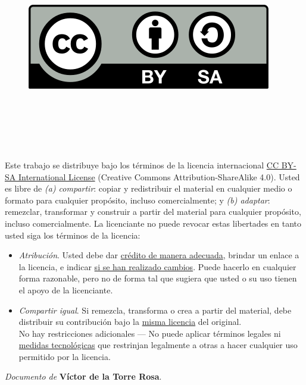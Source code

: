 
\cleardoublepage

\begin{flushright}
\begin{figure}
 \ \ \ \ \includegraphics[width=0.25\linewidth,right]{figs/by-sa.png}
 \label{fig:cc} 
 \end{figure}
\end{flushright}

\

\

\

\noindent
Este trabajo se distribuye bajo los términos de la licencia internacional \href{http://creativecommons.org/licenses/by-sa/4.0/}{CC BY-SA International License} (Creative Commons Attribution-ShareAlike 4.0). Usted es libre de \textit{(a) compartir}: copiar y redistribuir el material en cualquier medio o formato para cualquier propósito, incluso comercialmente; y \textit{(b) adaptar}: remezclar, transformar y construir a partir del material para cualquier propósito, incluso comercialmente. La licenciante no puede revocar estas libertades en tanto usted siga los términos de la licencia:

\begin{itemize}
\item \textit{Atribución}. Usted debe dar \href{https://creativecommons.org/licenses/by-sa/4.0/deed.es#ref-appropriate-credit}{crédito de manera adecuada}, brindar un enlace a la licencia, e indicar \href{https://creativecommons.org/licenses/by-sa/4.0/deed.es#ref-indicate-changes}{si se han realizado cambios}. Puede hacerlo en cualquier forma razonable, pero no de forma tal que sugiera que usted o su uso tienen el apoyo de la licenciante.
\item \textit{Compartir igual}. Si remezcla, transforma o crea a partir del material, debe distribuir su contribución bajo la \href{https://creativecommons.org/licenses/by-sa/4.0/deed.es#ref-same-license}{misma licencia} del original.\\
No hay restricciones adicionales — No puede aplicar términos legales ni \href{https://creativecommons.org/licenses/by-sa/4.0/deed.es#ref-technological-measures}{medidas tecnológicas} que restrinjan legalmente a otras a hacer cualquier uso permitido por la licencia.
\end{itemize}

\begin{flushright}
		\vspace{7.0 cm}
		\emph{Documento de} \textbf{Víctor de la Torre Rosa}. %
\end{flushright}


